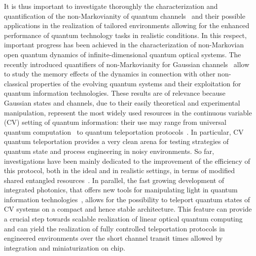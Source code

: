 \documentclass[prl,twocolumn,aps,floatfix,showpacs,tightenlines,superscriptaddress,amsmath,amssymb,amsfonts,10pt]{revtex4-1}
\begin{document}
It is thus important to investigate thoroughly the characterization and quantification of the non-Markovianity of quantum channels~\cite{0034-4885-77-9-094001, RevModPhys.88.021002} and their possible applications in the realization of tailored environments allowing for the enhanced performance of quantum technology tasks in realistic conditions.
In this respect, important progress has been achieved in the characterization of non-Markovian open quantum dynamics of infinite-dimensional quantum optical systems. The recently introduced quantifiers of non-Markovianity for Gaussian channels~\cite{PhysRevA.84.052118,PhysRevLett.115.070401,PhysRevA.92.052122,Groblacher(2015)} allow to study the memory effects of the dynamics in connection with other non-classical properties of the evolving quantum systems and their exploitation for quantum information technologies. These results are of relevance because Gaussian states and channels, due to their easily theoretical and experimental manipulation, represent the most widely used resources in the continuous variable (CV) setting of quantum information: their use may range from universal quantum computation~\cite{PhysRevLett.97.110501} to quantum teleportation protocols~\cite{PhysRevLett.80.869, PhysRevA.76.022301, PhysRevA.81.012333, PhysRevA.82.062329,PhysRevA.84.034305}.
In particular, CV quantum teleportation provides a very clean arena for testing strategies of quantum state and process engineering in noisy environments.
So far, investigations have been mainly dedicated to the improvement of the efficiency of this protocol, both in the ideal and in realistic settings, in terms of modified shared entangled resources~\cite{PhysRevA.76.022301, PhysRevA.81.012333, PhysRevA.82.062329}. In parallel, the fast growing development of integrated photonics, that offers new tools for manipulating light in quantum information technologies~\cite{Politi2009, OBrien2009, Thylen2014}, allows for the possibility to teleport quantum states of CV systems on a compact and hence stable architecture. This feature can provide a crucial step towards scalable realization of linear optical quantum computing~\cite{Metcalf2014} and can yield the realization of fully controlled teleportation protocols in engineered environments over the short channel transit times allowed by integration and miniaturization on chip.
\end{document}

